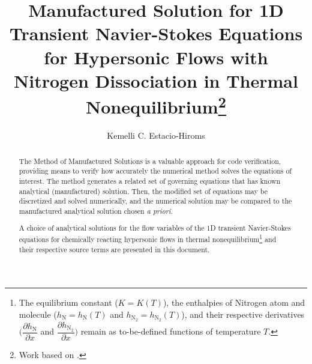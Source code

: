 \documentclass[10pt]{article}
\title{Manufactured Solution for 1D Transient Navier-Stokes Equations for Hypersonic Flows with Nitrogen Dissociation in Thermal Nonequilibrium\footnote{Work based on \citet*{Kirk2011}.}}
\author{Kemelli C. Estacio-Hiroms}
\newcommand{\diff}[2] {\dfrac{\partial #1 }{\partial #2}}
\newcommand{\N}{\text{N}}
\begin{document}
\maketitle
\tableofcontents
\begin{abstract}
The Method of Manufactured Solutions is a valuable approach for code verification, providing means to verify how accurately the numerical method solves the equations of interest. The method generates a related set of governing equations that has known analytical (manufactured) solution. Then, the modified set of equations may be discretized and solved numerically, and the numerical solution may be compared to the manufactured analytical solution  chosen \textit{a priori}.

A choice of analytical solutions for the flow variables of the 1D transient Navier-Stokes equations for chemically reacting hypersonic flows in thermal nonequilibrium\footnote{The equilibrium constant ($K=K(T)$), the enthalpies of Nitrogen atom and molecule ($h_{\N}=h_{\N}(T)$ and $h_{\N_2}=h_{\N_2}(T)$),  and their respective derivatives $\Big(\diff{h_{\N}}{x}$ and $\diff{h_{\N_2}}{x}\Big)$ remain as to-be-defined functions of temperature $T$.}  and their respective source terms are presented in this document.
\end{abstract}
\end{document}
